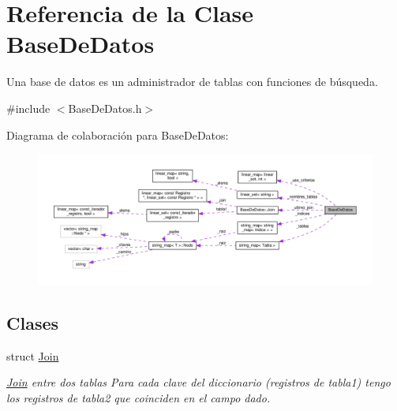 \hypertarget{classBaseDeDatos}{\section{Referencia de la Clase Base\-De\-Datos}
\label{classBaseDeDatos}
}


Una base de datos es un administrador de tablas con funciones de búsqueda.  




{\ttfamily \#include $<$Base\-De\-Datos.\-h$>$}



Diagrama de colaboración para Base\-De\-Datos\-:
\nopagebreak
\begin{figure}[H]
\begin{center}
\leavevmode
\includegraphics[width=350pt]{classBaseDeDatos__coll__graph}
\end{center}
\end{figure}
\subsection*{Clases}
\begin{DoxyCompactItemize}
\item 
struct \hyperlink{structBaseDeDatos_1_1Join}{Join}
\begin{DoxyCompactList}\small\item\em \hyperlink{structBaseDeDatos_1_1Join}{Join} entre dos tablas Para cada clave del diccionario (registros de tabla1) tengo los registros de tabla2 que coinciden en el campo dado. \end{DoxyCompactList}\end{DoxyCompactItemize}
